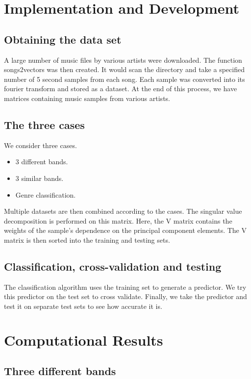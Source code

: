 \documentclass[a4paper]{article}
\begin{document}
\section{Implementation and Development}


\subsection{Obtaining the data set}

A large number of music files by various artists were downloaded. The function songs2vectors was then created. It would scan the directory and take a specified number of 5 second samples from each song. Each sample was converted into its fourier transform and stored as a dataset. At the end of this process, we have matrices containing music samples from various artists.



\subsection{The three cases}
We consider three cases.
\begin{itemize}
	\item  3 different bands.
	\item  3 similar bands.
	\item Genre classification.
\end{itemize}

Multiple datasets are then combined according to the cases. The singular value decomposition is performed on this matrix. Here, the V matrix contains the weights of the sample's dependence on the principal component elements. The V matrix is then sorted into the training and testing sets.
\subsection{Classification, cross-validation and testing}

The classification algorithm uses the training set to generate a predictor. We try this predictor on the test set to cross validate. Finally, we take the predictor and test it on separate test sets to see how accurate it is.



\section{Computational Results}

\subsection{Three different bands}
\end{document}
